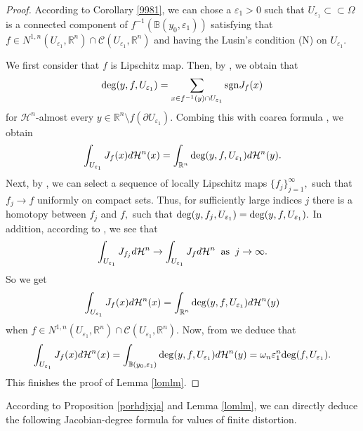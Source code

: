 \documentclass[11pt,twoside]{article}
\theoremstyle{definition}
\theoremstyle{remark}
\begin{document}
\begin{proof}
According to Corollary \ref{9981}, we can chose a $\varepsilon_{1}>0$  such that $U_{\varepsilon_{1}}\subset\subset\Omega$ is a connected component of $f^{-1}(\mathbb{B}(y_{0},\varepsilon_{1}))$  satisfying that $f\in N^{1,n}(U_{\varepsilon_{1}},\mathbb{R}^{n})\cap \mathcal{C}(U_{\varepsilon_{1}},\mathbb{R}^{n})$ and having the Lusin's condition (N) on $U_{\varepsilon_{1}}.$

We first consider that $f$ is Lipschitz map. Then,  by \cite[Lemma 3.5]{Kir16}, we obtain that
$${\rm deg}(y,f,U_{\varepsilon_{1}})=\sum_{x\in f^{-1}(y)\cap U_{\varepsilon_{1}}}{\rm sgn}J_{f}(x)$$
for $\mathcal{H}^{n}$-almost every $y\in \mathbb{R}^{n}\setminus f(\partial U_{\varepsilon_{1}}).$ Combing this with coarea formula \cite[Theorem 3.3]{Kir16}, we obtain
\begin{equation}\label{shij}
\int_{U_{\varepsilon_{1}}}J_{f}(x)d\mathcal{H}^{n}(x)=\int_{\mathbb{R}^{n}}{\rm deg}(y,f,U_{\varepsilon_{1}})d\mathcal{H}^{n}(y).
\end{equation}
Next, by  \cite[Lemma 4.3 ]{Kir14}, we can select a sequence of locally Lipschitz maps $\{f_{j}\}_{j=1}^{\infty},$ such that $f_{j}\rightarrow f$ uniformly on compact sets. 
 Thus, for sufficiently large indices $j$ there is a homotopy between $f_{j}$ and $f,$ such that ${\rm deg}(y,f_{j},U_{\varepsilon_{1}})={\rm deg}(y,f,U_{\varepsilon_{1}}).$
 In addition, according to \cite[Corollary 2.31]{Kir14}, we see that $$\int_{U_{\varepsilon_{1}}}J_{f_{j}}d\mathcal{H}^{n}\rightarrow \int_{U_{\varepsilon_{1}}}J_{f}d\mathcal{H}^{n}\;\;{\rm as}\;\;j\rightarrow\infty.$$
 So we get 
 \begin{equation}\label{ssvsvshij}
\int_{U_{\varepsilon_{1}}}J_{f}(x)d\mathcal{H}^{n}(x)=\int_{\mathbb{R}^{n}}{\rm deg}(y,f,U_{\varepsilon_{1}})d\mathcal{H}^{n}(y)
\end{equation}
when $f\in N^{1,n}(U_{\varepsilon_{1}},\mathbb{R}^{n})\cap \mathcal{C}(U_{\varepsilon_{1}},\mathbb{R}^{n}).$ Now, from  \cite[Lemma 2.7]{Kir16} we deduce that 
$$\int_{U_{\varepsilon_{1}}}J_{f}(x)d\mathcal{H}^{n}(x)=\int_{\mathbb{B}(y_{0},\varepsilon_{1})}{\rm deg}(y,f,U_{\varepsilon_{1}})d\mathcal{H}^{n}(y)=\omega_{n}\varepsilon_{1}^{n}{\rm deg}(f,U_{\varepsilon_{1}}).$$
This finishes the proof of Lemma \ref{lomlm}.
\end{proof}
According to Proposition \ref{porhdjxja} and Lemma \ref{lomlm}, we can directly deduce the following Jacobian-degree formula for values of finite distortion. 
\end{document}
